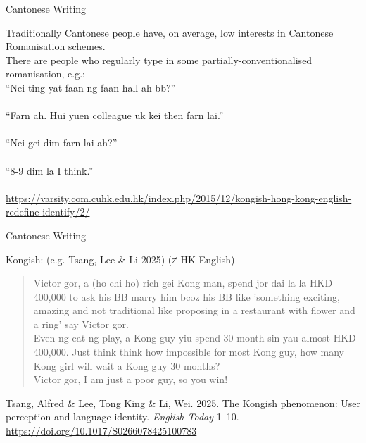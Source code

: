 \documentclass{beamer}
\begin{document}
\begin{frame}[fragile]{Cantonese Writing}

Traditionally Cantonese people have, on average, low interests in Cantonese Romanisation schemes.\\
\bigskip
There are people who regularly type in some partially-conventionalised romanisation, e.g.:\\
\smallskip
“Nei ting yat faan ng faan hall ah bb?”\\
\\
“Farn ah. Hui yuen colleague uk kei then farn lai.”\\
\\
“Nei gei dim farn lai ah?”\\
\\
“8-9 dim la I think.”\\
\\

\vfill {} {\tiny \url{https://varsity.com.cuhk.edu.hk/index.php/2015/12/kongish-hong-kong-english-redefine-identify/2/}}\par

\end{frame}

\begin{frame}[fragile]{Cantonese Writing}

Kongish: (e.g. Tsang, Lee \& Li 2025) (≠ HK English)\\

\bigskip
\begin{quote}
Victor gor, a (ho chi ho) rich gei Kong man, spend jor dai la la HKD 400,000 to ask his BB marry him bcoz his BB like 'something exciting, amazing and not traditional like proposing in a restaurant with flower and a ring' say Victor gor.\\
\smallskip
Even ng eat ng play, a Kong guy yiu spend 30 month sin yau almost HKD 400,000. Just think think how impossible for most Kong guy, how many Kong girl will wait a Kong guy 30 months?\\
\smallskip
Victor gor, I am just a poor guy, so you win!\\
\end{quote}

\vfill {} {\tiny Tsang, Alfred \& Lee, Tong King \& Li, Wei. 2025. The Kongish phenomenon: User perception and language identity. \textit{English Today} 1–10. \url{https://doi.org/10.1017/S0266078425100783
}}\par
\end{frame}
\end{document}
